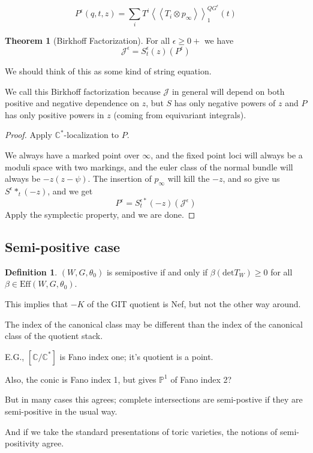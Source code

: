\documentclass{amsart}
\theoremstyle{definition}
\newtheorem{theorem}[dummy]{Theorem}
\newtheorem{definition}[dummy]{Definition}
\newcommand{\proj}{\mathbb{P}}
\newcommand{\J}{\mathcal{J}}
\newcommand{\C}{\mathbb{C}}
\begin{document}
$$P^\epsilon(q,t,z)=\sum_i T^i\left\langle\left\langle T_i\otimes p_\infty\right\rangle\right\rangle ^{QG^\epsilon}_1(t)$$

\begin{theorem}[Birkhoff Factorization]
For all $\epsilon\geq 0+$ we have
$$ \J^\epsilon=S^\epsilon_t(z)(P^\epsilon)$$
\end{theorem}
We should think of this as some kind of string equation.

We call this Birkhoff factorization because $\J$ in general will depend on both positive and negative dependence on $z$, but $S$ has only negative powers of $z$ and $P$ has only positive powers in $z$ (coming from equivariant integrals).

\begin{proof}
Apply $\C^*$-localization to $P$.  

We always have a marked point over $\infty$, and the fixed point loci will always be a moduli space with two markings, and the euler class of the normal bundle will always be $-z(z-\psi)$.  The insertion of $p_\infty$ will kill the $-z$, and so give us $S^\epsilon*_t(-z)$, and we get
$$P^\epsilon=S_t^{\epsilon*}(-z)(\J^\epsilon)$$
Apply the symplectic property, and we are done.
\end{proof}


\subsection{Semi-positive case}

\begin{definition}
$(W,G,\theta_0)$ is semipostive if and only if $\beta(\text{det} T_W)\geq 0$ for all $\beta\in\text{Eff}(W,G,\theta_0)$.
\end{definition}

This implies that $-K $ of the GIT quotient is Nef, but not the other way around.

The index of the canonical class may be different than the index of the canonical class of the quotient stack.

E.G., $[\C/\C^*]$ is Fano index one; it's quotient is a point.

Also, the conic is Fano index 1, but gives $\proj^1$ of Fano index 2?

But in many cases this agrees; complete intersections are semi-postive if they are semi-positive in the usual way.

And if we take the standard presentations of toric varieties, the notions of semi-positivity agree.
\end{document}
